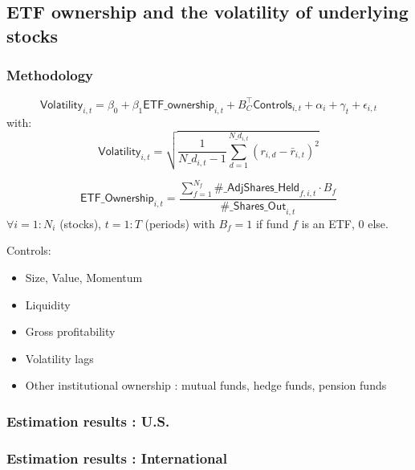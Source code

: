 \documentclass[9pt, usenames, dvipsnames]{beamer}
\begin{document}
\subsection{ETF ownership and the volatility of underlying stocks}
\begin{frame}
  \frametitle{Methodology}
\begin{equation}
  \mathsf{Volatility}_{i,t} = \beta_{0} + \beta_{1} \mathsf{ETF\_ownership}_{i, t} + B_{C}^{\intercal} \mathsf{Controls}_{i, t} + \alpha_{i} + \gamma_{t} + \epsilon_{i, t}
\end{equation}
with:
\begin{equation*}
  \mathsf{Volatility}_{i, t} = \sqrt{\frac{1}{N\_d_{i, t} - 1} \sum_{d = 1}^{N\_d_{i, t}} (r_{i, d} - \bar{r}_{i, t})^2}
  \end{equation*}

\begin{equation*}
  \mathsf{ETF\_Ownership}_{i, t} = \frac{\sum_{f = 1}^{N_{f}} \mathsf{\#\_AdjShares\_Held}_{f, i, t}\cdot B_{f}}{\mathsf{\#\_Shares\_Out}_{i, t}}
\end{equation*}
$\forall i = 1:N_{i}$ (stocks), $t = 1:T$ (periods)
with $B_{f} = 1$ if fund $f$ is an ETF, $0$ else.

Controls:
\begin{itemize}
\item Size, Value, Momentum
\item Liquidity
\item Gross profitability
\item Volatility lags
\item Other institutional ownership : mutual funds, hedge funds, pension funds
\end{itemize}
\end{frame}

\begin{frame}
  \frametitle{Estimation results : U.S.}
  \centering
  
\end{frame}

\begin{frame}
  \frametitle{Estimation results : International}
  \centering
  
\end{frame}
\end{document}

